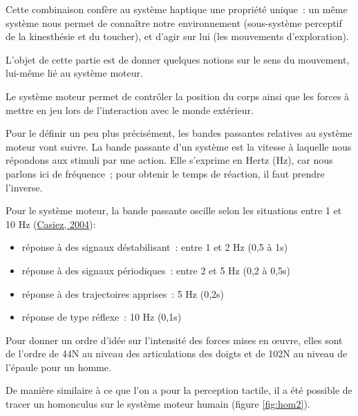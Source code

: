 \documentclass[
]{book}
\providecommand{\tightlist}{%
  \setlength{\itemsep}{0pt}\setlength{\parskip}{0pt}}
\begin{document}
Cette combinaison confère au système haptique une propriété unique~: un
même système nous permet de connaître notre environnement (sous-système
perceptif de la kinesthésie et du toucher), et d'agir sur lui (les mouvements
d'exploration).

L'objet de cette partie est de donner quelques notions sur le sens du
mouvement, lui-même lié au système moteur.

Le système moteur permet de contrôler la position du corps ainsi que les
forces à mettre en jeu lors de l'interaction avec le monde extérieur.

Pour le définir un peu plus précisément, les bandes passantes relatives au
système moteur vont suivre. La bande passante d'un système est la vitesse à
laquelle nous répondons aux stimuli par une action. Elle s'exprime en Hertz
(Hz), car nous parlons ici de fréquence~; pour obtenir le temps de réaction,
il faut prendre l'inverse.

Pour le système moteur, la bande passante oscille selon les situations
entre 1 et 10 Hz (\protect\hyperlink{ref-casiez2004contribution}{Casiez, 2004}):

\begin{itemize}
\tightlist
\item
  réponse à des signaux déstabilisant~: entre 1 et 2 Hz
  (0,5 à 1s)
\item
  réponse à des signaux périodiques~: entre 2 et 5 Hz
  (0,2 à 0,5s)
\item
  réponse à des trajectoires apprises~: 5 Hz
  (0,2s)
\item
  réponse de type réflexe~: 10 Hz (0,1s)
\end{itemize}

Pour donner un ordre d'idée sur l'intensité des forces mises en œuvre,
elles sont de l'ordre de 44N au niveau des articulations des doigts et de
102N au niveau de l'épaule pour un homme.

De manière similaire à ce que l'on a pour la perception tactile, il a été
possible de tracer un homonculus sur le système moteur humain
(figure \ref{fig:hom2}).
\end{document}
